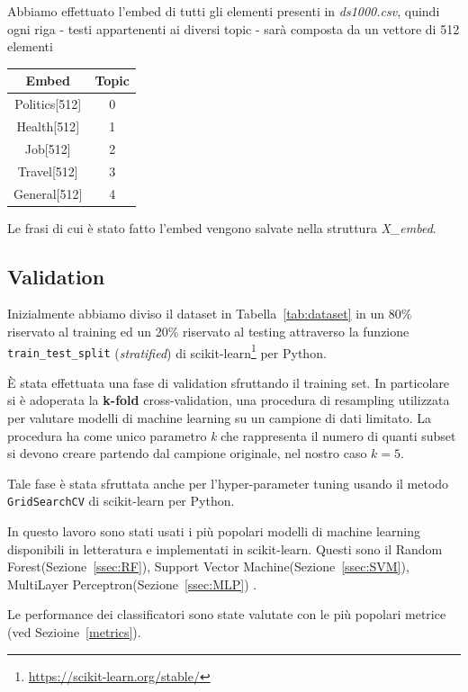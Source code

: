 Abbiamo effettuato l'embed di tutti gli elementi presenti in \textit{ds1000.csv}, quindi ogni riga - testi appartenenti ai diversi topic - sarà composta da un vettore di 512 elementi
\FloatBarrier
\begin{table}[h!t]
\centering
\begin{tabular}{|c|c|}
\hline
\textbf{Embed} & \textbf{Topic} \\ \hline
Politics{[}512{]} & 0 \\ \hline
Health{[}512{]} & 1 \\ \hline
Job{[}512{]} & 2 \\ \hline
Travel{[}512{]} & 3 \\ \hline
General{[}512{]} & 4 \\ \hline
\end{tabular}
\end{table}
Le frasi di cui è stato fatto l'embed vengono salvate nella struttura \textit{X\_embed}.



\subsection{Validation}
\label{ssec:validation_Topic}
Inizialmente abbiamo diviso il dataset in Tabella~\ref{tab:dataset} in un 80\% riservato al training ed un 20\% riservato al testing attraverso la funzione {\tt train\_test\_split} (\textit{stratified}) di scikit-learn\footnote{\url{https://scikit-learn.org/stable/}} per Python.

È stata effettuata una fase di validation sfruttando il training set. In particolare si è adoperata la \textbf{k-fold} cross-validation, una procedura di resampling utilizzata per valutare modelli di machine learning su un campione di dati limitato. La procedura ha come unico parametro \textit{k} che rappresenta il numero di quanti subset si devono creare partendo dal campione originale, nel nostro caso $ k = 5 $.

Tale fase è stata sfruttata anche per l'hyper-parameter tuning usando il metodo {\tt GridSearchCV} di scikit-learn per Python.

In questo lavoro sono stati usati i più popolari modelli di machine learning disponibili in letteratura e implementati in scikit-learn. Questi sono il Random Forest(Sezione~\ref{ssec:RF}), Support Vector Machine(Sezione~\ref{ssec:SVM}), MultiLayer Perceptron(Sezione~\ref{ssec:MLP}) .


Le performance dei classificatori sono state valutate con le più popolari metrice (ved Sezioine~\ref{metrics}).

